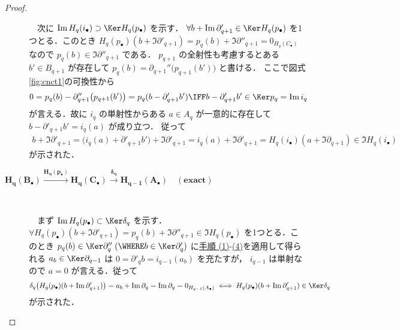 \documentclass[algtopo_main]{subfiles}
\begin{document}
\begin{proof}
\begin{description}
    　次に $\Im  H_q(i_\bullet) \supset \Ker H_q(p_\bullet)$ を示す．
    $\forall b + \Im \partial'_{q+1} \in \Ker H_q(p_\bullet)$ を1つとる．このとき $H_q(p_\bullet)(b + \Im \partial'_{q+1}) = p_q(b) + \Im \partial''_{q+1} = 0_{H_q(C_\bullet)}$ なので $p_q(b) \in \Im \partial''_{q+1}$ である．
    $p_{q+1}$ の全射性も考慮するとある $b' \in B_{q+1}$ が存在して $p_q(b) = \partial_{q+1}''\bigl( p_{q+1}(b')\bigr)$ と書ける．
    ここで図式\ref{fig:cnct1}の可換性から
    \begin{align}
        0 = p_q(b) - \partial_{q+1}''\bigl( p_{q+1}(b')\bigr) = p_q ( b - \partial'_{q+1} b' ) \IFF b - \partial'_{q+1} b' \in \Ker p_q = \Im i_q
    \end{align}
    が言える．故に $i_q$ の単射性からある $a \in A_q$ が一意的に存在して $b - \partial'_{q+1} b' = i_q(a)$ が成り立つ．
    従って
    \begin{align}
        b + \Im \partial'_{q+1} = \bigl(i_q(a) + \partial'_{q+1} b'\bigr) + \Im \partial'_{q+1} = i_q(a) + \Im \partial'_{q+1} = H_q(i_\bullet) (a + \Im \partial_{q+1}) \in \Im H_q(i_\bullet)
    \end{align}
    が示された．
    
    \item[$\bm{H_q(B_\bullet) \xrightarrow{H_q(p_\bullet)} H_q(C_\bullet) \xrightarrow{\delta_q} H_{q-1}(A_\bullet) \quad (\text{exact})}$]　
    
    　まず $\Im H_q(p_\bullet) \subset \Ker \delta_q$ を示す．$\forall H_q(p_\bullet)(b + \Im \partial'_{q+1}) = p_q(b) + \Im \partial''_{q+1} \in \Im H_q(p_\bullet)$ を1つとる．このとき $p_q(b) \in \Ker \partial''_q\; (\WHERE b \in \Ker \partial'_q)$ に\hyperref[pro:1]{手順 (1)}-\hyperref[pro:4]{(4)}を適用して得られる $a_b \in \Ker \partial_{q-1}$ は $0 = \partial'_q b = i_{q-1}(a_b)$ を充たすが，
    $i_{q-1}$ は単射なので $a = 0$ が言える．従って
    \begin{align}
        \delta_q \bigl( H_q(p_\bullet)(b + \Im \partial'_{q+1}) \bigr)  = a_b + \Im \partial_q = \Im \partial_q = 0_{H_{q-1}(A_\bullet)} \iff H_q(p_\bullet)(b + \Im \partial'_{q+1}) \in \Ker \delta_q
    \end{align}
    が示された．


\end{description}
\end{proof}
\end{document}
